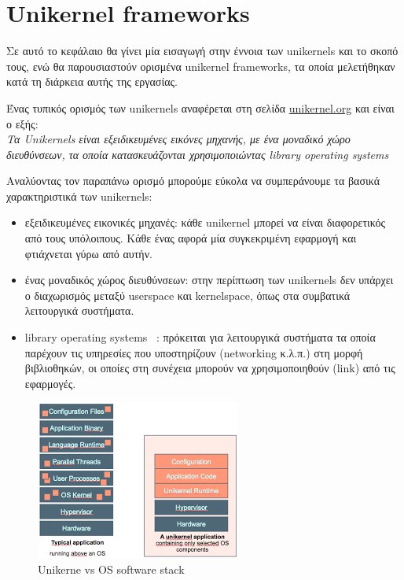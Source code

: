\chapter{Unikernel frameworks}
\label{chap:unikernels}

Σε αυτό το κεφάλαιο θα γίνει μία εισαγωγή στην έννοια των unikernels και το
σκοπό τους, ενώ θα παρουσιαστούν ορισμένα unikernel frameworks, τα οποία
μελετήθηκαν κατά τη διάρκεια αυτής της εργασίας. 

Ένας τυπικός ορισμός των unikernels αναφέρεται στη σελίδα
\href{http://unikernel.org/}{unikernel.org} και είναι ο εξής: 
\vspace{1ex}
\\
\textit{Τα Unikernels είναι εξειδικευμένες εικόνες μηχανής, με ένα
μοναδικό χώρο διευθύνσεων, τα οποία κατασκευάζονται χρησιμοποιώντας library
operating systems} \\
\vspace{1ex}

Αναλύοντας τον παραπάνω ορισμό μπορούμε εύκολα να συμπεράνουμε τα βασικά
χαρακτηριστικά των unikernels:
\begin{itemize}
	\item εξειδικευμένες εικονικές μηχανές: κάθε unikernel μπορεί να είναι
	διαφορετικός από τους υπόλοιπους. Κάθε ένας αφορά μία συγκεκριμένη
		εφαρμογή και φτιάχνεται γύρω από αυτήν.
	\item ένας μοναδικός χώρος διευθύνσεων: στην περίπτωση των unikernels
		δεν υπάρχει ο διαχωρισμός μεταξύ userspace και kernelspace, όπως
		στα συμβατικά λειτουργικά συστήματα.
	\item library operating systems ~\cite{porter2011rethinking}: πρόκειται
		για λειτουργικά συστήματα τα οποία παρέχουν τις υπηρεσίες που
		υποστηρίζουν (networking κ.λ.π.) στη μορφή βιβλιοθηκών, οι
		οποίες στη συνέχεια μπορούν να χρησιμοποιηθούν (link) από τις
		εφαρμογές. 
\end{itemize}

\begin{figure}[htp]
\centering
\includegraphics[scale=1]{figures/unikernel_vs_os.png}
\caption{Unikerne vs OS software stack\label{fig3_1}}
\end{figure}

